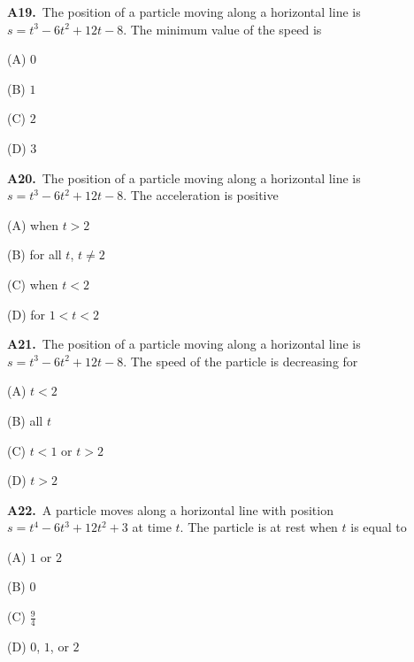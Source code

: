 \documentclass[11pt]{article}
\begin{document}
\bigskip\noindent\textbf{A19.}\ The position of a particle moving along a horizontal line is $s=t^3-6t^2+12t-8$. The minimum value of the speed is
\begin{list}{}{\setlength{\leftmargin}{3em}\setlength{\labelwidth}{2.5em}\setlength{\itemsep}{0pt}\setlength{\topsep}{2pt}}
\item[(A)] $0$
\item[(B)] $1$
\item[(C)] $2$
\item[(D)] $3$
\end{list}

\bigskip\noindent\textbf{A20.}\ The position of a particle moving along a horizontal line is $s=t^3-6t^2+12t-8$. The acceleration is positive
\begin{list}{}{\setlength{\leftmargin}{3em}\setlength{\labelwidth}{2.5em}\setlength{\itemsep}{0pt}\setlength{\topsep}{2pt}}
\item[(A)] when $t>2$
\item[(B)] for all $t$, $t \neq 2$
\item[(C)] when $t<2$
\item[(D)] for $1<t<2$
\end{list}

\bigskip\noindent\textbf{A21.}\ The position of a particle moving along a horizontal line is $s=t^3-6t^2+12t-8$. The speed of the particle is decreasing for
\begin{list}{}{\setlength{\leftmargin}{3em}\setlength{\labelwidth}{2.5em}\setlength{\itemsep}{0pt}\setlength{\topsep}{2pt}}
\item[(A)] $t<2$
\item[(B)] all $t$
\item[(C)] $t<1$ or $t>2$
\item[(D)] $t>2$
\end{list}

\bigskip\noindent\textbf{A22.}\ A particle moves along a horizontal line with position $s=t^4-6t^3+12t^2+3$ at time $t$. The particle is at rest when $t$ is equal to
\begin{list}{}{\setlength{\leftmargin}{3em}\setlength{\labelwidth}{2.5em}\setlength{\itemsep}{0pt}\setlength{\topsep}{2pt}}
\item[(A)] $1$ or $2$
\item[(B)] $0$
\item[(C)] $\frac94$
\item[(D)] $0$, $1$, or $2$
\end{list}
\end{document}
